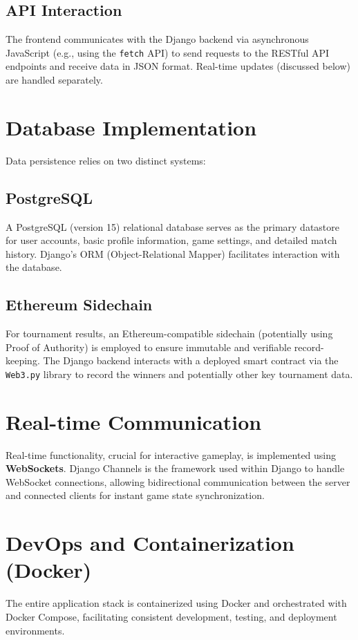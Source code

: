 \subsection{API Interaction}
The frontend communicates with the Django backend via asynchronous JavaScript (e.g., using the \texttt{fetch} API) to send requests to the RESTful API endpoints and receive data in JSON format. Real-time updates (discussed below) are handled separately.

\section{Database Implementation}
\label{sec:database_impl}
Data persistence relies on two distinct systems:

\subsection{PostgreSQL}
A PostgreSQL (version 15) relational database serves as the primary datastore for user accounts, basic profile information, game settings, and detailed match history. Django's ORM (Object-Relational Mapper) facilitates interaction with the database.

\subsection{Ethereum Sidechain}
For tournament results, an Ethereum-compatible sidechain (potentially using Proof of Authority) is employed to ensure immutable and verifiable record-keeping. The Django backend interacts with a deployed smart contract via the \texttt{Web3.py} library to record the winners and potentially other key tournament data.

\section{Real-time Communication}
\label{sec:realtime_impl}
Real-time functionality, crucial for interactive gameplay, is implemented using \textbf{WebSockets}. Django Channels is the framework used within Django to handle WebSocket connections, allowing bidirectional communication between the server and connected clients for instant game state synchronization.

\section{DevOps and Containerization (Docker)}
\label{sec:devops_impl}
The entire application stack is containerized using Docker and orchestrated with Docker Compose, facilitating consistent development, testing, and deployment environments.

